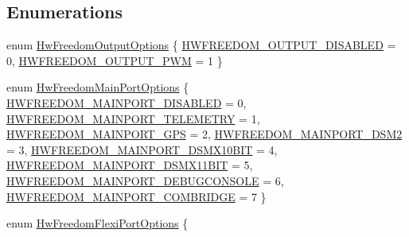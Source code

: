 \subsection*{\-Enumerations}
\begin{DoxyCompactItemize}
\item 
enum \hyperlink{group___hw_freedom_ga653362a7ad401bceeef0ccd2071eb78e}{\-Hw\-Freedom\-Output\-Options} \{ \hyperlink{group___hw_freedom_gga653362a7ad401bceeef0ccd2071eb78ea2389efff21fa6b449a615702880d3c5f}{\-H\-W\-F\-R\-E\-E\-D\-O\-M\-\_\-\-O\-U\-T\-P\-U\-T\-\_\-\-D\-I\-S\-A\-B\-L\-E\-D} = 0, 
\hyperlink{group___hw_freedom_gga653362a7ad401bceeef0ccd2071eb78ea5c75a021602c91c01ca5353f5c6c3852}{\-H\-W\-F\-R\-E\-E\-D\-O\-M\-\_\-\-O\-U\-T\-P\-U\-T\-\_\-\-P\-W\-M} = 1
 \}
\item 
enum \hyperlink{group___hw_freedom_ga6fa1869afef683bf7dcc3cef64815c7b}{\-Hw\-Freedom\-Main\-Port\-Options} \{ \*
\hyperlink{group___hw_freedom_gga6fa1869afef683bf7dcc3cef64815c7ba9d40bc10186ba62cc32da42de7cd2c83}{\-H\-W\-F\-R\-E\-E\-D\-O\-M\-\_\-\-M\-A\-I\-N\-P\-O\-R\-T\-\_\-\-D\-I\-S\-A\-B\-L\-E\-D} = 0, 
\hyperlink{group___hw_freedom_gga6fa1869afef683bf7dcc3cef64815c7ba387dccd644a620de31c05a1ba300010e}{\-H\-W\-F\-R\-E\-E\-D\-O\-M\-\_\-\-M\-A\-I\-N\-P\-O\-R\-T\-\_\-\-T\-E\-L\-E\-M\-E\-T\-R\-Y} = 1, 
\hyperlink{group___hw_freedom_gga6fa1869afef683bf7dcc3cef64815c7babee576810eeab746e4ca5307a092d3d4}{\-H\-W\-F\-R\-E\-E\-D\-O\-M\-\_\-\-M\-A\-I\-N\-P\-O\-R\-T\-\_\-\-G\-P\-S} = 2, 
\hyperlink{group___hw_freedom_gga6fa1869afef683bf7dcc3cef64815c7ba64306a79e8168bd973266b932964e986}{\-H\-W\-F\-R\-E\-E\-D\-O\-M\-\_\-\-M\-A\-I\-N\-P\-O\-R\-T\-\_\-\-D\-S\-M2} = 3, 
\*
\hyperlink{group___hw_freedom_gga6fa1869afef683bf7dcc3cef64815c7bab9edf341fa49cbddfa82370fdf58d4ee}{\-H\-W\-F\-R\-E\-E\-D\-O\-M\-\_\-\-M\-A\-I\-N\-P\-O\-R\-T\-\_\-\-D\-S\-M\-X10\-B\-I\-T} = 4, 
\hyperlink{group___hw_freedom_gga6fa1869afef683bf7dcc3cef64815c7ba26ca0cad3984901b7acfd0306fe9587d}{\-H\-W\-F\-R\-E\-E\-D\-O\-M\-\_\-\-M\-A\-I\-N\-P\-O\-R\-T\-\_\-\-D\-S\-M\-X11\-B\-I\-T} = 5, 
\hyperlink{group___hw_freedom_gga6fa1869afef683bf7dcc3cef64815c7bac7ebb4ebfd572fc3e4ab39399325e013}{\-H\-W\-F\-R\-E\-E\-D\-O\-M\-\_\-\-M\-A\-I\-N\-P\-O\-R\-T\-\_\-\-D\-E\-B\-U\-G\-C\-O\-N\-S\-O\-L\-E} = 6, 
\hyperlink{group___hw_freedom_gga6fa1869afef683bf7dcc3cef64815c7ba084732b8b6734416cb5bf838493e88f6}{\-H\-W\-F\-R\-E\-E\-D\-O\-M\-\_\-\-M\-A\-I\-N\-P\-O\-R\-T\-\_\-\-C\-O\-M\-B\-R\-I\-D\-G\-E} = 7
 \}
\item 
enum \hyperlink{group___hw_freedom_ga2869a644abdac09041a699813c2d8b09}{\-Hw\-Freedom\-Flexi\-Port\-Options} \{ \*

\end{DoxyCompactItemize}

